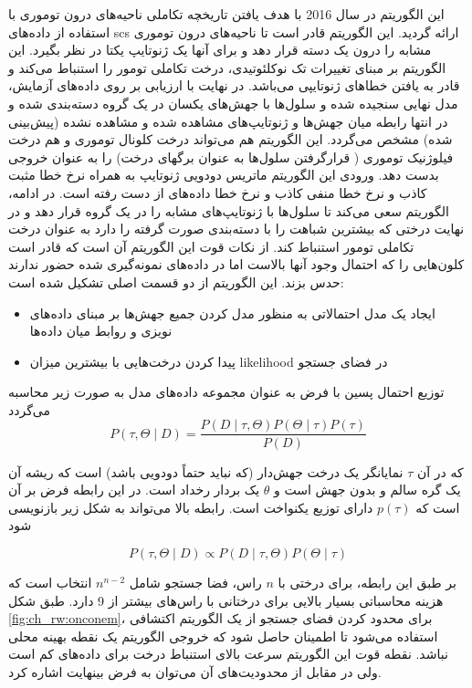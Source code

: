 این الگوریتم در سال 2016 با هدف یافتن تاریخچه تکاملی ناحیه‌های درون توموری با استفاده از داده‌های \gls{scs} ارائه گردید. این الگوریتم قادر است تا ناحیه‌های درون توموری مشابه را درون یک دسته قرار دهد و برای آنها یک ژنوتایپ یکتا در نظر بگیرد. این الگوریتم بر مبنای تغییرات تک نوکلئوتیدی، درخت تکاملی تومور را استنباط می‌کند و قادر به یافتن خطاهای ژنوتایپی می‌باشد. در نهایت با ارزیابی بر روی داده‌های آزمایش، مدل نهایی سنجیده شده و سلول‌ها با جهش‌های یکسان در یک گروه دسته‌بندی شده و در انتها رابطه میان جهش‌ها و ژنوتایپ‌های مشاهده شده و مشاهده نشده (پیش‌بینی شده) مشخص می‌گردد. این الگوریتم هم می‌تواند درخت کلونال توموری و هم درخت فیلوژنیک توموری ( قرارگرفتن سلول‌ها به عنوان برگهای درخت) را به عنوان خروجی بدست دهد. ورودی این الگوریتم ماتریس دودویی ژنوتایپ به همراه نرخ خطا مثبت کاذب و نرخ خطا منفی کاذب و نرخ خطا داده‌های از دست رفته است. در ادامه، الگوریتم سعی می‌کند تا سلول‌ها با ژنوتایپ‌های مشابه را در یک گروه قرار دهد و در نهایت درختی که بیشترین شباهت را با دسته‌بندی صورت گرفته را دارد به عنوان درخت تکاملی تومور استنباط کند. از نکات قوت این الگوریتم آن است که قادر است کلون‌هایی را که احتمال وجود آنها بالاست اما در داده‌های نمونه‌گیری شده حضور ندارند حدس بزند. این الگوریتم از دو قسمت اصلی تشکیل شده است: 
\begin{itemize}
	\item ایجاد یک مدل احتمالاتی به منظور مدل کردن جمیع جهش‌ها بر مبنای داده‌های نویزی و روابط میان داده‌ها 
	\item پیدا کردن درخت‌هایی با بیشترین میزان \gls{likelihood} در فضای جستجو 
\end{itemize}
توزیع احتمال پسین با فرض  به عنوان مجموعه داده‌های مدل به صورت زیر محاسبه می‌گردد
\begin{equation}
P(\tau, \Theta \mid D)=\frac{P(D \mid \tau, \Theta) P(\Theta \mid \tau) P(\tau)}{P(D)}
\end{equation}

که در آن $\tau$ نمایانگر یک درخت جهش‌دار (که نباید حتماً دودویی باشد) است که ریشه آن یک گره سالم و بدون جهش است و $\theta$ یک بردار رخداد است. در این رابطه فرض بر آن است که $p(\tau)$ دارای توزیع یکنواخت است. رابطه بالا می‌تواند به شکل زیر بازنویسی شود

\begin{equation}
P(\tau, \Theta \mid D) \propto P(D \mid \tau, \Theta) P(\Theta \mid \tau)
\end{equation}

بر طبق این رابطه، برای درختی با  $n$ راس، فضا جستجو شامل $n^{n-2}$  انتخاب است که هزینه محاسباتی بسیار بالایی برای درختانی با راس‌های بیشتر از 9 دارد. طبق شکل \ref{fig:ch_rw:onconem}، برای محدود کردن فضای جستجو از یک الگوریتم اکتشافی استفاده می‌شود تا اطمینان حاصل شود که خروجی الگوریتم یک نقطه بهینه محلی نباشد. نقطه قوت این الگوریتم سرعت بالای استنباط درخت برای داده‌های کم است ولی در مقابل از محدودیت‌های آن می‌توان به فرض بینهایت اشاره کرد.

